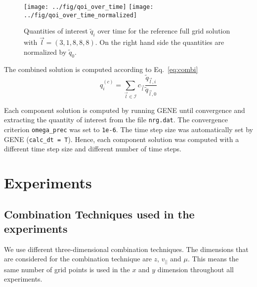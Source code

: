 \documentclass{scrartcl}
\begin{document}
\begin{figure}[h]
	\centering
	\texttt{[image: ../fig/qoi\_over\_time]} \texttt{[image: ../fig/qoi\_over\_time\_normalized]}
	\caption{Quantities of interest $\tilde{q}_i$ over time for the reference full grid solution with $\vec{l} = (3,1,8,8,8)$. On the right hand side the quantities are normalized by $\tilde{q}_0$.}
	\label{fig:qoi}
\end{figure}


The combined solution is computed according to Eq.~\eqref{eq:combi}
\begin{equation}
	q_i^{(c)} =    
     \sum_{\vec l \in \mathcal I}\limits c_{\vec l} \frac{\tilde{q}_{\vec l, i}}{\tilde{q}_{\vec l, 0}}
\end{equation} 

Each component solution is computed by running GENE until convergence and extracting the quantity of interest from the file \texttt{nrg.dat}. The convergence criterion \texttt{omega\_prec} was set to \texttt{1e-6}. The time step size was automatically set by GENE (\texttt{calc\_dt = T}). Hence, each component solution was computed with a different time step size and different number of time 
steps.


\section{Experiments}

\subsection*{Combination Techniques used in the experiments}

We use different three-dimensional combination techniques. The dimensions that are considered for the combination technique are $z$, $v_{||}$ and $\mu$. This means the same number of grid points is used in the $x$ and $y$ dimension throughout all experiments. 
\end{document}
